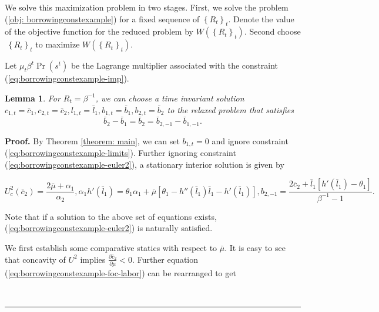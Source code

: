 \documentclass[thmsb,11pt]{article}
\newtheorem{lemma}{Lemma}
\newenvironment{proof}[1][Proof]{\noindent \textbf{#1.} }{\  \rule{0.5em}{0.5em}}
\begin{document}
\begin{appendix}
We solve this maximization problem in two stages. First, we solve the
problem  (\ref{obj: borrowingconstexample}) for a fixed sequence of $\left \{ R_{t}\right \} _{t}.$ Denote
the value of the objective function for the reduced problem by $W\left(
\left \{ R_{t}\right \} _{t}\right) .$ Second choose $\ \left \{ R_{t}\right \} _{t}$ to maximize $W\left( \left \{ R_{t}\right \} _{t}\right)$.

\noindent Let $\mu_t\beta^t \Pr(s^t)$ be the Lagrange multiplier associated with the constraint (\ref{eq:borrowingconstexample-imp}).
 \begin{lemma}
 For $R_t=\beta^{-1}$, we can choose a  time invariant solution  $c_{1,t}= \bar{c}_{1},c_{2,t}=\bar{c}_{2},l_{1,t}=\bar{l}%
_{1},b_{1,t}=\bar{b}_{1},b_{2,t}=\bar{b}_{2}$ to the relaxed problem that satisfies
\begin{equation*}
\bar{b}_{2}-\bar{b}_{1}=\bar{b}_{2}=\bar{b}_{2,-1}-\bar{b}_{1,-1}.
\end{equation*}

\end{lemma}
\begin{proof}
  By Theorem \ref {theorem: main}, we can set $b_{1,t}=0$  and ignore constraint (\ref{eq:borrowingconstexample-limits}). Further ignoring constraint (\ref{eq:borrowingconstexample-euler2}), a stationary interior solution is given by

 \begin{subequations}
 \begin{equation}
  \label{eq:borrowingconstexample-foc-c2}
U^2_c(\bar{c}_2)=\frac{2\bar{\mu}+\alpha_1}{\alpha_2},
 \end{equation}
\begin{equation}
\label{eq:borrowingconstexample-foc-labor}
\alpha_1 h'(\bar{l}_1)=\theta_1\alpha_1+\bar{\mu}[\theta_1-h''(\bar{l}_1)\bar{l}_1-h'(\bar{l}_1)],
 \end{equation}
\begin{equation}
\label{eq:borrowingconstexample-foc-b_2}
b_{2,-1}=\frac{2\bar{c}_2+ \bar{l}_1\left[h'(\bar{l}_1)-\theta_1 \right] }{\beta^{-1}-1}.
\end{equation}

 \end{subequations}


Note that if a solution to the above set of equations exists, (\ref{eq:borrowingconstexample-euler2}) is naturally satisfied.

We first establish some comparative statics with respect to $\bar{\mu}$. It is easy to see that concavity of $U^2$ implies $\frac{\partial \bar{c}_2}{\partial \mu}<0$. Further equation (\ref{eq:borrowingconstexample-foc-labor}) can be rearranged to get


\end{proof}
\end{appendix}
\end{document}
